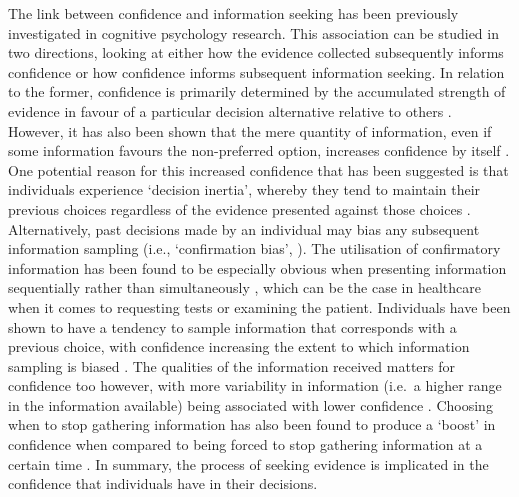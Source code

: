 \documentclass[a4paper, nobind]{templates/ociamthesis}
\begin{document}
The link between confidence and information seeking has been previously investigated in cognitive psychology research. This association can be studied in two directions, looking at either how the evidence collected subsequently informs confidence or how confidence informs subsequent information seeking. In relation to the former, confidence is primarily determined by the accumulated strength of evidence in favour of a particular decision alternative relative to others \autocite{vickers_effects_1982,pleskac2010}. However, it has also been shown that the mere quantity of information, even if some information favours the non-preferred option, increases confidence by itself \autocite{ko_divergent_2022}. One potential reason for this increased confidence that has been suggested is that individuals experience `decision inertia', whereby they tend to maintain their previous choices regardless of the evidence presented against those choices \autocite{akaishi_autonomous_2014}. Alternatively, past decisions made by an individual may bias any subsequent information sampling (i.e., `confirmation bias', \autocite{nickerson_confirmation_1998}). The utilisation of confirmatory information has been found to be especially obvious when presenting information sequentially rather than simultaneously \autocite{jonas_confirmation_2001}, which can be the case in healthcare when it comes to requesting tests or examining the patient. Individuals have been shown to have a tendency to sample information that corresponds with a previous choice, with confidence increasing the extent to which information sampling is biased \autocite{kaanders_humans_2022}. The qualities of the information received matters for confidence too however, with more variability in information (i.e.~a higher range in the information available) being associated with lower confidence \autocite{desender_subjective_2018}. Choosing when to stop gathering information has also been found to produce a `boost' in confidence when compared to being forced to stop gathering information at a certain time \autocite{wei_confidence_2021}. In summary, the process of seeking evidence is implicated in the confidence that individuals have in their decisions.
\end{document}
